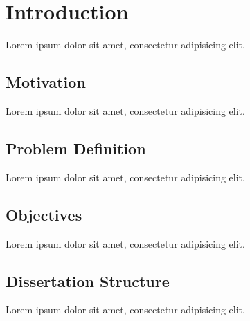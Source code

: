 \chapter{Introduction} %
\label{cha:introduction}

Lorem ipsum dolor sit amet, consectetur adipisicing elit.

\section{Motivation} %
\label{sec:introduction:motivation}

Lorem ipsum dolor sit amet, consectetur adipisicing elit.


\section{Problem Definition} %
\label{sec:introduction:problem_definition}

Lorem ipsum dolor sit amet, consectetur adipisicing elit.


\section{Objectives} %
\label{sec:introduction:objectives}

Lorem ipsum dolor sit amet, consectetur adipisicing elit.


\section{Dissertation Structure} %
\label{sec:introduction:dissertation_structure}

Lorem ipsum dolor sit amet, consectetur adipisicing elit.


